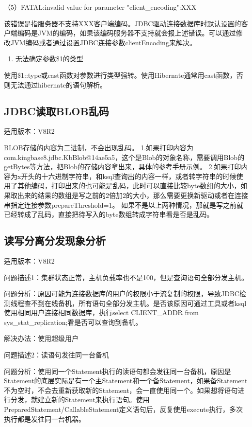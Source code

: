 \documentclass[letterpaper,10pt,english]{sphinxmanual}
\begin{document}
（5）FATAL:invalid value for parameter "client\_encoding":XXX

该错误是指服务器不支持XXX客户端编码。JDBC驱动连接数据库时默认设置的客户端编码是JVM的编码，如果该编码服务器不支持就会报上述错误。可以通过修改JVM编码或者通过设置JDBC连接参数clientEncoding来解决。
\begin{enumerate}
%
\setcounter{enumi}{7}
\item {} 
无法确定参数\$1的类型

\end{enumerate}

使用\$1::type或cast函数对参数进行类型强转。使用Hibernate通常用cast函数，否则无法通过hibernate的语句解析。


\subsection{JDBC读取BLOB乱码}
\label{\detokenize{interface/jdbc:jdbcblob}}
适用版本：V8R2

BLOB存储的内容为二进制，不会出现乱码。
1.如果打印内容为com.kingbase8.jdbc.KbBlob@14ae5a5，这个是Blob的对象名称，需要调用Blob的getBytes等方法，把Blob的存储内容拿出来，具体的参考手册示例。
2.如果打印内容为x开头的十六进制字符串，和ksql查询出的内容一样，或者转字符串的时候使用了其他编码，打印出来的也可能是乱码，此时可以直接比较byte数组的大小，如果取出来的结果的数组是写之前的2倍加2的大小，那么需要更换新驱动或者在连接串指定连接参数prepareThreshold=\sphinxhyphen{}1。
如果不是以上两种情况，那就是写之前就已经转成了乱码，直接把待写入的byte数组转成字符串看是否是乱码。


\subsection{读写分离分发现象分析}
\label{\detokenize{interface/jdbc:id15}}
适用版本：V8R2

问题描述1：集群状态正常，主机负载率也不是100，但是查询语句全部分发主机。

问题分析：原因可能为连接数据库的用户的权限小于流复制的权限，导致JDBC检测线程查不到在线备机，所有语句全部分发主机。是否该原因可通过工具或者ksql使用相同用户连接相同数据库，执行select CLIENT\_ADDR from sys\_stat\_replication;看是否可以查询到备机。

解决办法：使用超级用户

问题描述2：读语句发往同一台备机

问题分析：使用同一个Statement执行的读语句都会发往同一台备机，原因是Statement的底层实际是有一个主Statement和一个备Statement，如果备Statement不为空时，不会去重新获取新的Statement，会一直使用同一个。如果想将语句进行分发，就建立新的Statement来执行语句。使用PreparedStatement/CallableStatement定义语句后，反复使用execute执行，多次执行都是发往同一台机器。
\end{document}
